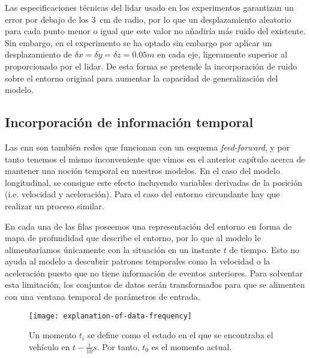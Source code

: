 Las especificaciones técnicas del \ac{lidar} usado en los experimentos garantizan un error por debajo de los \SI{3}{\cm} de radio, por lo que un desplazamiento aleatorio para cada punto menor o igual que este valor no añadiría más ruido del existente. Sin embargo, en el experimento se ha optado sin embargo por aplicar un desplazamiento de $\delta x = \delta y = \delta z = 0.05m$ en cada eje, ligeramente superior al proporcionado por el lidar. De esta forma se pretende la incorporación de ruido sobre el entorno original para aumentar la capacidad de generalización del modelo.

\subsection{Incorporación de información temporal}

Las \ac{cnn} son también redes que funcionan con un esquema \textit{feed-forward}, y por tanto tenemos el mismo inconveniente que vimos en el anterior capítulo acerca de mantener una noción temporal en nuestros modelos. En el caso del modelo longitudinal, se consigue este efecto incluyendo variables derivadas de la posición (i.e. velocidad y aceleración). Para el caso del entorno circundante hay que realizar un proceso similar.

En cada una de las filas poseemos una representación del entorno en forma de mapa de profundidad que describe el entorno, por lo que al modelo le alimentaríamos únicamente con la situación en un instante $t$ de tiempo. Esto no ayuda al modelo a descubrir patrones temporales como la velocidad o la aceleración puesto que no tiene información de eventos anteriores. Para solventar esta limitación, los conjuntos de datos serán transformados para que se alimenten con una ventana temporal de parámetros de entrada.

\begin{figure}
	\centering
	\texttt{[image: explanation-of-data-frequency]}
	\caption[Momento $t_i$en el conjunto de datos]{Un momento $t_i$ se define como el estado en el que se encontraba el vehículo en $t - \frac{i}{10}s$. Por tanto, $t_0$ es el momento actual.}
	\label{fig:moments-illustration}
\end{figure}

